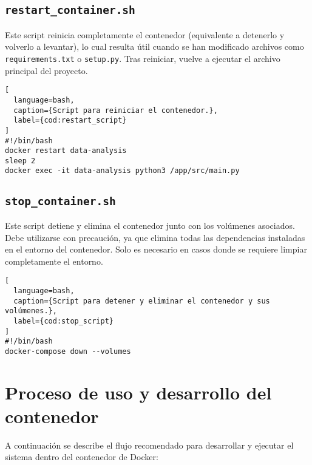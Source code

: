 \subsection{\texttt{restart\_container.sh}}

Este script reinicia completamente el contenedor (equivalente a detenerlo y volverlo a levantar), lo cual resulta útil cuando se han modificado archivos como \texttt{requirements.txt} o \texttt{setup.py}. Tras reiniciar, vuelve a ejecutar el archivo principal del proyecto.

\begin{lstlisting}[
  language=bash,
  caption={Script para reiniciar el contenedor.},
  label={cod:restart_script}
]
#!/bin/bash
docker restart data-analysis
sleep 2
docker exec -it data-analysis python3 /app/src/main.py
\end{lstlisting}

\subsection{\texttt{stop\_container.sh}}

Este script detiene y elimina el contenedor junto con los volúmenes asociados. Debe utilizarse con precaución, ya que elimina todas las dependencias instaladas en el entorno del contenedor. Solo es necesario en casos donde se requiere limpiar completamente el entorno.

\begin{lstlisting}[
  language=bash,
  caption={Script para detener y eliminar el contenedor y sus volúmenes.},
  label={cod:stop_script}
]
#!/bin/bash
docker-compose down --volumes
\end{lstlisting}

\section{Proceso de uso y desarrollo del contenedor}

A continuación se describe el flujo recomendado para desarrollar y ejecutar el sistema dentro del contenedor de Docker:

